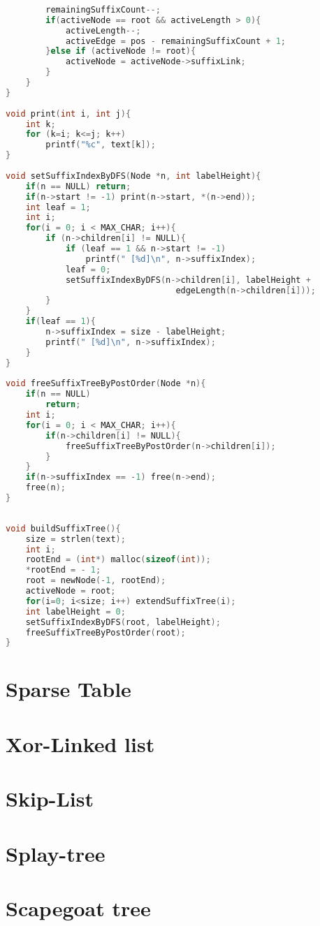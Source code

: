 \begin{lstlisting}[language=C++]
 
        remainingSuffixCount--;
        if(activeNode == root && activeLength > 0){
            activeLength--;
            activeEdge = pos - remainingSuffixCount + 1;
        }else if (activeNode != root){
            activeNode = activeNode->suffixLink;
        }
    }
}
 
void print(int i, int j){
    int k;
    for (k=i; k<=j; k++)
        printf("%c", text[k]);
}
 
void setSuffixIndexByDFS(Node *n, int labelHeight){
    if(n == NULL) return; 
    if(n->start != -1) print(n->start, *(n->end));
    int leaf = 1;
    int i;
    for(i = 0; i < MAX_CHAR; i++){
        if (n->children[i] != NULL){
            if (leaf == 1 && n->start != -1)
                printf(" [%d]\n", n->suffixIndex); 
            leaf = 0;
            setSuffixIndexByDFS(n->children[i], labelHeight +
                                  edgeLength(n->children[i]));
        }
    }
    if(leaf == 1){
        n->suffixIndex = size - labelHeight;
        printf(" [%d]\n", n->suffixIndex);
    }
}
 
void freeSuffixTreeByPostOrder(Node *n){
    if(n == NULL)
        return;
    int i;
    for(i = 0; i < MAX_CHAR; i++){
        if(n->children[i] != NULL){
            freeSuffixTreeByPostOrder(n->children[i]);
        }
    }
    if(n->suffixIndex == -1) free(n->end);
    free(n);
}
\end{lstlisting}
\newpage
\begin{lstlisting}[language=C++]
 
void buildSuffixTree(){
    size = strlen(text);
    int i;
    rootEnd = (int*) malloc(sizeof(int));
    *rootEnd = - 1;
 	root = newNode(-1, rootEnd); 
    activeNode = root;
    for(i=0; i<size; i++) extendSuffixTree(i);
    int labelHeight = 0;
    setSuffixIndexByDFS(root, labelHeight); 
    freeSuffixTreeByPostOrder(root);
}
\end{lstlisting}

\section{Sparse Table}
\section{Xor-Linked list}
\section{Skip-List}
\section{Splay-tree}
\section{Scapegoat tree}